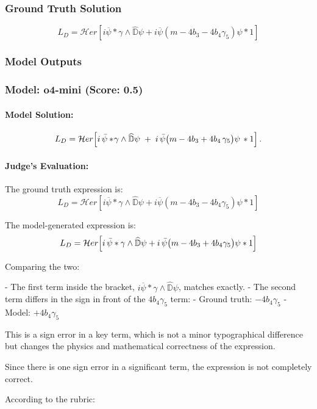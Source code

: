\documentclass[10pt]{article}
\begin{document}
\subsubsection*{Ground Truth Solution}
\[ \boxed{L_D = \mathcal{H}er \left[ i\overline{\psi} * \gamma \wedge \widehat{\mathbb{D}}\psi + i\overline{\psi} (m -4 b_3 -4 b_4 \gamma_5) \psi *1 \right]} \]

\subsubsection*{Model Outputs}
\subsubsection*{Model: o4-mini (Score: 0.5)}
\paragraph*{Model Solution:}
\[ L_{D}
=\mathcal{H}er\Bigl[
i\,\bar\psi*\!\gamma\wedge\widehat{\mathbb{D}}\psi
\;+\;i\,\bar\psi\bigl(m-4b_{3}+4b_{4}\,\gamma_{5}\bigr)\psi\,*1
\Bigr]\,. \]

\paragraph*{Judge's Evaluation:}

The ground truth expression is:
\[
L_D = \mathcal{H}er \left[ i\overline{\psi} * \gamma \wedge \widehat{\mathbb{D}}\psi + i\overline{\psi} (m -4 b_3 -4 b_4 \gamma_5) \psi *1 \right]
\]

The model-generated expression is:
\[
L_{D} = \mathcal{H}er \Bigl[ i\,\bar\psi * \gamma \wedge \widehat{\mathbb{D}}\psi + i\,\bar\psi \bigl(m - 4 b_3 + 4 b_4 \gamma_5 \bigr) \psi *1 \Bigr]
\]

Comparing the two:

- The first term inside the bracket, \( i \overline{\psi} * \gamma \wedge \widehat{\mathbb{D}} \psi \), matches exactly.
- The second term differs in the sign in front of the \(4 b_4 \gamma_5\) term:
  - Ground truth: \(-4 b_4 \gamma_5\)
  - Model: \(+4 b_4 \gamma_5\)

This is a sign error in a key term, which is not a minor typographical difference but changes the physics and mathematical correctness of the expression.

Since there is one sign error in a significant term, the expression is not completely correct.

According to the rubric:
\end{document}
